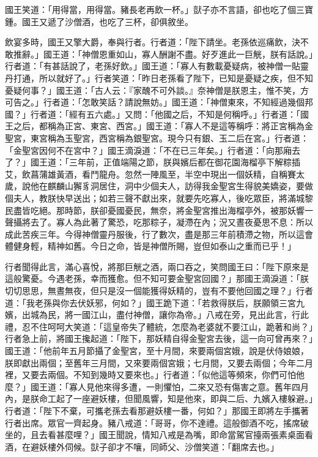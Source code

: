 國王笑道：「用得當，用得當。豬長老再飲一杯。」獃子亦不言語，卻也吃了個三寶鍾。國王又遞了沙僧酒，也吃了三杯，卻俱敘坐。

飲宴多時，國王又擎大爵，奉與行者。行者道：「陛下請坐。老孫依巡痛飲，決不敢推辭。」國王道：「神僧恩重如山，寡人酬謝不盡。好歹進此一巨觥，朕有話說。」行者道：「有甚話說了，老孫好飲。」國王道：「寡人有數載憂疑病，被神僧一貼靈丹打通，所以就好了。」行者笑道：「昨日老孫看了陛下，已知是憂疑之疾，但不知憂疑何事？」國王道：「古人云：『家醜不可外談。』奈神僧是朕恩主，惟不笑，方可告之。」行者道：「怎敢笑話？請說無妨。」國王道：「神僧東來，不知經過幾個邦國？」行者道：「經有五六處。」又問：「他國之后，不知是何稱呼。」行者道：「國王之后，都稱為正宮、東宮、西宮。」國王道：「寡人不是這等稱呼：將正宮稱為金聖宮，東宮稱為玉聖宮，西宮稱為銀聖宮。現今只有銀、玉二后在宮。」行者道：「金聖宮因何不在宮中？」國王滴淚道：「不在已三年矣。」行者道：「向那廂去了？」國王道：「三年前，正值端陽之節，朕與嬪后都在御花園海榴亭下解粽插艾，飲菖蒲雄黃酒，看鬥龍舟。忽然一陣風至，半空中現出一個妖精，自稱賽太歲，說他在麒麟山獬豸洞居住，洞中少個夫人，訪得我金聖宮生得貌美嬌姿，要做個夫人，教朕快早送出；如若三聲不獻出來，就要先吃寡人，後吃眾臣，將滿城黎民盡皆吃絕。那時節，朕卻憂國憂民，無奈，將金聖宮推出海榴亭外，被那妖響一聲攝將去了。寡人為此著了驚恐，吃那粽子，凝滯在內；況又晝夜憂思不息：所以成此苦疾三年。今得神僧靈丹服後，行了數次，盡是那三年前積滯之物，所以這會體健身輕，精神如舊。今日之命，皆是神僧所賜，豈但如泰山之重而已乎！」

行者聞得此言，滿心喜悅，將那巨觥之酒，兩口吞之，笑問國王曰：「陛下原來是這般驚憂。今遇老孫，幸而獲愈。但不知可要金聖宮回國？」那國王滴淚道：「朕切切思思，無晝無夜，但只是沒一個能獲得妖精的，豈有不要他回國之理？」行者道：「我老孫與你去伏妖邪，何如？」國王跪下道：「若救得朕后，朕願領三宮九嬪，出城為民，將一國江山，盡付神僧，讓你為帝。」八戒在旁，見出此言，行此禮，忍不住呵呵大笑道：「這皇帝失了體統，怎麼為老婆就不要江山，跪著和尚？」行者急上前，將國王攙起道：「陛下，那妖精自得金聖宮去後，這一向可曾再來？」國王道：「他前年五月節攝了金聖宮，至十月間，來要兩個宮娥，說是伏侍娘娘，朕即獻出兩個；至舊年三月間，又來要兩個宮娥；七月間，又要去兩個；今年二月裡，又要去兩個。不知到幾時又要來也。」行者道：「似他這等頻來，你們可怕他麼？」國王道：「寡人見他來得多遭，一則懼怕，二來又恐有傷害之意。舊年四月內，是朕命工起了一座避妖樓，但聞風響，知是他來，即與二后、九嬪入樓躲避。」行者道：「陛下不棄，可攜老孫去看那避妖樓一番，何如？」那國王即將左手攜著行者出席。眾官一齊起身。豬八戒道：「哥哥，你不達禮。這般御酒不吃，搖席破坐的，且去看甚麼哩？」國王聞說，情知八戒是為嘴，即命當駕官擡兩張素桌面看酒，在避妖樓外伺候。獃子卻才不嚷，同師父、沙僧笑道：「翻席去也。」

